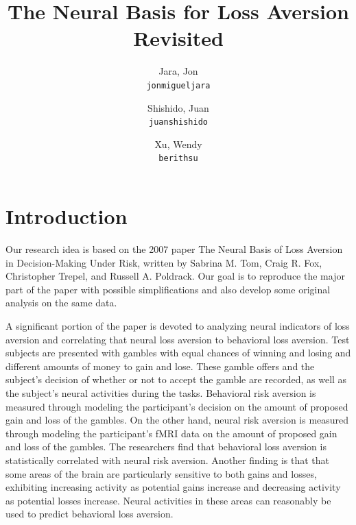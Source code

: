 \documentclass[11pt]{article}
\title{The Neural Basis for Loss Aversion Revisited}
\author{
  Jara, Jon\\
  \texttt{jonmigueljara}
  \and
  Shishido, Juan\\
  \texttt{juanshishido}
  \and
  Xu, Wendy\\
  \texttt{berithsu}
}
\begin{document}
\maketitle


\section{Introduction}

Our research idea is based on the 2007 paper The Neural Basis of
Loss Aversion in Decision-Making Under Risk, written by Sabrina M. Tom, Craig
R. Fox, Christopher Trepel, and Russell A. Poldrack\cite{tom}. Our goal is to
reproduce the major part of the paper with possible simplifications and also
develop some original analysis on the same data.

A significant portion of the paper is devoted to analyzing neural
indicators of loss aversion and correlating that neural loss aversion to
behavioral loss aversion. Test subjects are presented with gambles with equal
chances of winning and losing and different amounts of money to gain and lose.
These gamble offers and the subject's decision of whether or not to accept the
gamble are recorded, as well as the subject's neural activities during the
tasks. Behavioral risk aversion is measured through modeling the participant's
decision on the amount of proposed gain and loss of the gambles. On the other
hand, neural risk aversion is measured through modeling the participant's fMRI
data on the amount of proposed gain and loss of the gambles. The researchers
find that behavioral loss aversion is statistically correlated with neural risk
aversion. Another finding is that that some areas of the brain are particularly
sensitive to both gains and losses, exhibiting increasing activity as potential
gains increase and decreasing activity as potential losses increase. Neural
activities in these areas can reasonably be used to predict behavioral loss
aversion.
\end{document}
